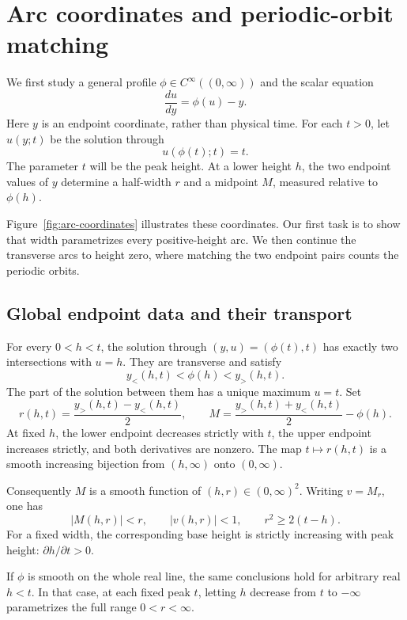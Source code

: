 \section{Arc coordinates and periodic-orbit matching}\label{sec:arcs}

We first study a general profile
\(\phi\in C^\infty((0,\infty))\) and the scalar equation
\begin{equation}\label{eq:arc-ode}
  \frac{du}{dy}=\phi(u)-y.
\end{equation}
Here \(y\) is an endpoint coordinate, rather than physical time.
For each \(t>0\), let \(u(y;t)\) be the solution through
\[
  u(\phi(t);t)=t.
\]
The parameter \(t\) will be the peak height. At a lower height \(h\), the
two endpoint values of \(y\) determine a half-width \(r\) and a midpoint
\(M\), measured relative to \(\phi(h)\).

Figure~\ref{fig:arc-coordinates} illustrates these coordinates.
Our first task is to show that width parametrizes every positive-height
arc. We then continue the transverse arcs to height zero, where
matching the two endpoint pairs counts the periodic orbits.

\subsection{Global endpoint data and their transport}

\begin{lemma}\label{lem:arc-data}
For every \(0<h<t\), the solution through
\((y,u)=(\phi(t),t)\) has exactly two intersections with \(u=h\).
They are transverse and satisfy
\[
  y_<(h,t)<\phi(h)<y_>(h,t).
\]
The part of the solution between them has a unique maximum \(u=t\).
Set
\begin{equation}\label{eq:arc-endpoint-data}
  r(h,t)=\frac{y_>(h,t)-y_<(h,t)}2,\qquad
  M=\frac{y_>(h,t)+y_<(h,t)}2-\phi(h).
\end{equation}
At fixed \(h\), the lower endpoint decreases strictly with \(t\), the
upper endpoint increases strictly, and both derivatives are nonzero.
The map \(t\mapsto r(h,t)\) is a smooth increasing bijection from
\((h,\infty)\) onto \((0,\infty)\).

Consequently \(M\) is a smooth function of \((h,r)\in(0,\infty)^2\).
Writing \(v=M_r\), one has
\begin{equation}\label{eq:arc-strict-data}
  |M(h,r)|<r,\qquad |v(h,r)|<1,\qquad
  r^2\ge 2(t-h).
\end{equation}
For a fixed width, the corresponding base height is strictly increasing
with peak height: \(\partial h/\partial t>0\).

If \(\phi\) is smooth on the whole real line, the same conclusions hold
for arbitrary real \(h<t\). In that case, at each fixed peak \(t\), letting
\(h\) decrease from \(t\) to \(-\infty\) parametrizes the full range
\(0<r<\infty\).
\end{lemma}

